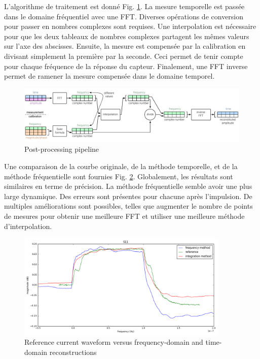 L'algorithme de traitement est donné Fig. \ref{fig:postprocess-nfs-pipeline}.
La mesure temporelle est passée dans le domaine fréquentiel avec une FFT.
Diverses opérations de conversion pour passer en nombres complexes sont requises.
Une interpolation est nécessaire pour que les deux tableaux de nombres complexes partagent les mêmes valeurs sur l'axe des abscisses.
Ensuite, la mesure est compensée par la calibration en divisant simplement la première par la seconde.
Ceci permet de tenir compte pour chaque fréquence de la réponse du capteur.
Finalement, une FFT inverse permet de ramener la mesure compensée dans le domaine temporel.

\begin{figure}[!h]
  \centering
  \includegraphics[width=\textwidth]{src/1/figures/frequency_post_process_flow.pdf}
  \caption{Post-processing pipeline}
  \label{fig:postprocess-nfs-pipeline}
\end{figure}

Une comparaison de la courbe originale, de la méthode temporelle, et de la méthode fréquentielle sont fournies Fig. \ref{fig:freq-domain-reconstructed}.
Globalement, les résultats sont similaires en terme de précision.
La méthode fréquentielle semble avoir une plus large dynamique.
Des erreurs sont présentes pour chacune après l'impulsion.
De multiples améliorations sont possibles, telles que augmenter le nombre de points de mesures pour obtenir une meilleure FFT et utiliser une meilleure méthode d'interpolation.

\begin{figure}[!h]
  \centering
  \includegraphics[width=0.9\textwidth]{src/1/figures/final_comparison_reconstructions.png}
  \caption{Reference current waveform versus frequency-domain and time-domain reconstructions}
  \label{fig:freq-domain-reconstructed}
\end{figure}
